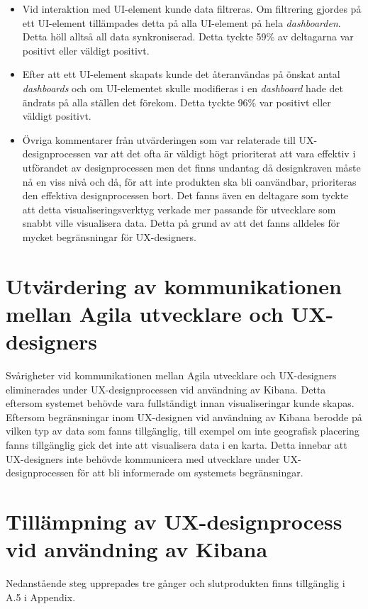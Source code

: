 \documentclass[12pt]{kththesis}
\begin{document}
\begin{itemize}
\item Vid interaktion med UI-element kunde data filtreras. Om filtrering gjordes på ett UI-element tillämpades detta på alla UI-element på hela \textit{dashboarden}. Detta höll alltså all data synkroniserad. Detta tyckte 59\% av deltagarna var positivt eller väldigt positivt.

\item Efter att ett UI-element skapats kunde det återanvändas på önskat antal \textit{dashboards} och om UI-elementet skulle modifieras i en \textit{dashboard} hade det ändrats på alla ställen det förekom. Detta tyckte 96\% var positivt eller väldigt positivt.

\item Övriga kommentarer från utvärderingen som var relaterade till UX-designprocessen var att det ofta är väldigt högt prioriterat att vara effektiv i utförandet av designprocessen men det finns undantag då designkraven måste nå en viss nivå och då, för att inte produkten ska bli oanvändbar, prioriteras den effektiva designprocessen bort. Det fanns även en deltagare som tyckte att detta visualiseringsverktyg verkade mer passande för utvecklare som snabbt ville visualisera data. Detta på grund av att det fanns alldeles för mycket begränsningar för UX-designers.
\end{itemize}

\section{Utvärdering av kommunikationen mellan Agila utvecklare och UX-designers}

Svårigheter vid kommunikationen mellan Agila utvecklare och UX-designers eliminerades under UX-designprocessen vid användning av Kibana. Detta eftersom systemet behövde vara fullständigt innan visualiseringar kunde skapas. Eftersom begränsningar inom UX-designen vid användning av Kibana berodde på vilken typ av data som fanns tillgänglig, till exempel om inte geografisk placering fanns tillgänglig gick det inte att visualisera data i en karta. Detta innebar att UX-designers inte behövde kommunicera med utvecklare under UX-designprocessen för att bli informerade om systemets begränsningar. 

\section{Tillämpning av UX-designprocess vid användning av Kibana}

Nedanstående steg upprepades tre gånger och slutprodukten finns tillgänglig i A.5 i Appendix.  
\end{document}
